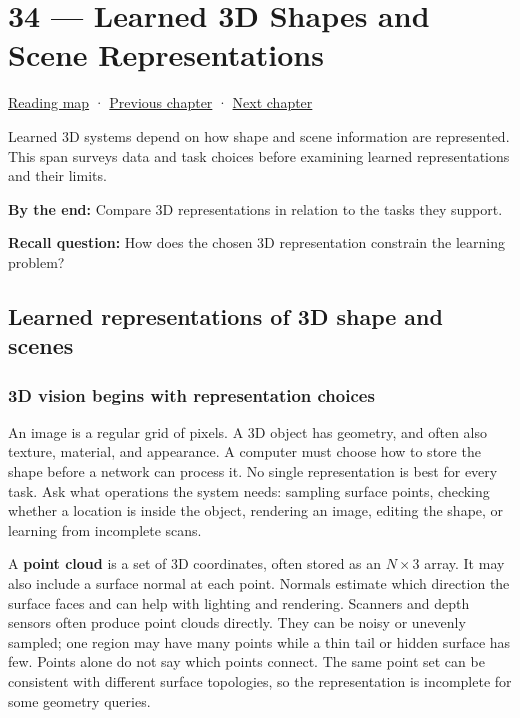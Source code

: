 \hypertarget{04-visual-computing-ii-ch034}{}
\chapter{34 --- Learned 3D Shapes and Scene Representations}\label{04-visual-computing-ii-ch034-learned-3d-shapes-and-scene-representations}

\hyperref[volume-reading-map]{Reading map} · \hyperref[04-visual-computing-ii-ch033]{Previous chapter} · \hyperref[04-visual-computing-ii-ch035]{Next chapter}

Learned 3D systems depend on how shape and scene information are represented. This span surveys data and task choices before examining learned representations and their limits.

\textbf{By the end:} Compare 3D representations in relation to the tasks they support.

\textbf{Recall question:} How does the chosen 3D representation constrain the learning problem?

\section{Learned representations of 3D shape and scenes}\label{04-visual-computing-ii-ch034-learned-representations-of-3d-shape-and-scenes}

\subsection{3D vision begins with representation choices}\label{04-visual-computing-ii-ch034-d-vision-begins-with-representation-choices}

An image is a regular grid of pixels. A 3D object has geometry, and often also texture, material, and appearance. A computer must choose how to store the shape before a network can process it. No single representation is best for every task. Ask what operations the system needs: sampling surface points, checking whether a location is inside the object, rendering an image, editing the shape, or learning from incomplete scans.

A \textbf{point cloud} is a set of 3D coordinates, often stored as an \(N\times3\) array. It may also include a surface normal at each point. Normals estimate which direction the surface faces and can help with lighting and rendering. Scanners and depth sensors often produce point clouds directly. They can be noisy or unevenly sampled; one region may have many points while a thin tail or hidden surface has few. Points alone do not say which points connect. The same point set can be consistent with different surface topologies, so the representation is incomplete for some geometry queries.

